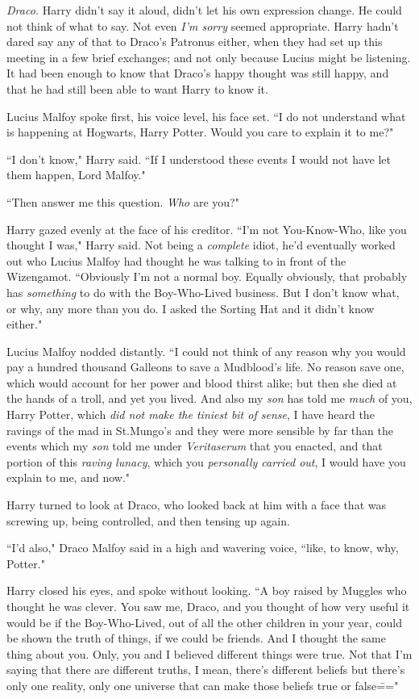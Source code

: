 \emph{Draco.} Harry didn't say it aloud, didn't let his own expression change. He could not think of what to say. Not even \emph{I'm sorry} seemed appropriate. Harry hadn't dared say any of that to Draco's Patronus either, when they had set up this meeting in a few brief exchanges; and not only because Lucius might be listening. It had been enough to know that Draco's happy thought was still happy, and that he had still been able to want Harry to know it.

Lucius Malfoy spoke first, his voice level, his face set. ``I do not understand what is happening at Hogwarts, Harry Potter. Would you care to explain it to me?"

``I don't know," Harry said. ``If I understood these events I would not have let them happen, Lord Malfoy."

``Then answer me this question. \emph{Who} are you?"

Harry gazed evenly at the face of his creditor. ``I'm not You-Know-Who, like you thought I was," Harry said. Not being a \emph{complete} idiot, he'd eventually worked out who Lucius Malfoy had thought he was talking to in front of the Wizengamot. ``Obviously I'm not a normal boy. Equally obviously, that probably has \emph{something} to do with the Boy-Who-Lived business. But I don't know what, or why, any more than you do. I asked the Sorting Hat and it didn't know either."

Lucius Malfoy nodded distantly. ``I could not think of any reason why you would pay a hundred thousand Galleons to save a Mudblood's life. No reason save one, which would account for her power and blood thirst alike; but then she died at the hands of a troll, and yet you lived. And also my \emph{son} has told me \emph{much} of you, Harry Potter, which \emph{did not make the tiniest bit of sense}, I have heard the ravings of the mad in St.\?Mungo's and they were more sensible by far than the events which my \emph{son} told me under \emph{Veritaserum} that you enacted, and that portion of this \emph{raving lunacy}, which you \emph{personally carried out}, I would have you explain to me, and now."

Harry turned to look at Draco, who looked back at him with a face that was screwing up, being controlled, and then tensing up again.

``I'd also," Draco Malfoy said in a high and wavering voice, ``like, to know, why, Potter."

Harry closed his eyes, and spoke without looking. ``A boy raised by Muggles who thought he was clever. You saw me, Draco, and you thought of how very useful it would be if the Boy-Who-Lived, out of all the other children in your year, could be shown the truth of things, if we could be friends. And I thought the same thing about you. Only, you and I believed different things were true. Not that I'm saying that there are different truths, I mean, there's different beliefs but there's only one reality, only one universe that can make those beliefs true or false\==="

